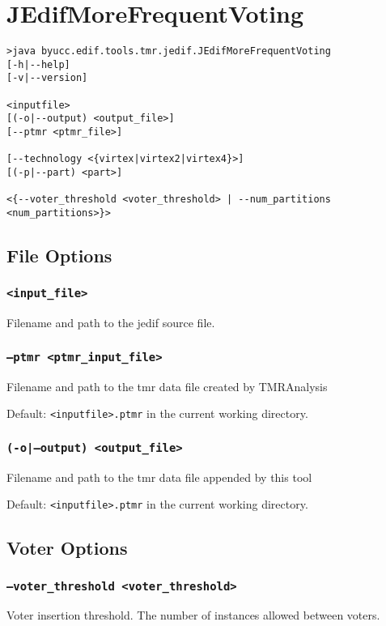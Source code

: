 \section{JEdifMoreFrequentVoting}
\begin{verbatim}
>java byucc.edif.tools.tmr.jedif.JEdifMoreFrequentVoting
[-h|--help] 
[-v|--version] 

<inputfile>
[(-o|--output) <output_file>] 
[--ptmr <ptmr_file>] 

[--technology <{virtex|virtex2|virtex4}>] 
[(-p|--part) <part>] 

<{--voter_threshold <voter_threshold> | --num_partitions <num_partitions>}>

\end{verbatim}

\subsection{File Options}

\subsubsection{\texttt{<input\_file>}}
Filename and path to the jedif source file.

\subsubsection{\texttt{--ptmr <ptmr\_input\_file>}}
Filename and path to the tmr data file created by TMRAnalysis

Default: \texttt{<inputfile>.ptmr} in the current working directory.

\subsubsection{\texttt{(-o|--output) <output\_file>}}
Filename and path to the tmr data file appended by this tool

Default: \texttt{<inputfile>.ptmr} in the current working directory.


\subsection{Voter Options}

\subsubsection{\texttt{--voter\_threshold <voter\_threshold>}}
Voter insertion threshold. The number of instances allowed between voters.

